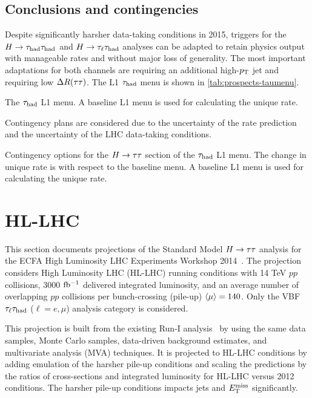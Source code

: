 \subsection{Conclusions and contingencies}

Despite significantly harsher data-taking conditions in 2015, triggers for the $H\rightarrow\tau_\text{had}\tau_\text{had}$ and $H\rightarrow\tau_\ell\tau_\text{had}$ analyses can be adapted to retain physics output with manageable rates and without major loss of generality. The most important adaptations for both channels are requiring an additional high-$p_{\mathrm{T}}$ jet and requiring low $\Delta R(\tau\tau)$. The L1 $\tau_\text{had}$ menu is shown in \cref{tab:prospects-taumenu}.

\begin{table}[!htpb]
  \centering
  \renewcommand{\arraystretch}{1.4}
  \caption{The $\tau_\text{had}$ L1 menu. A baseline L1 menu is used for calculating the unique rate.}
  
  \label{tab:prospects-taumenu}
\end{table}

Contingency plans are considered due to the uncertainty of the rate prediction and the uncertainty of the LHC data-taking conditions.

\begin{table}[!htpb]
  \centering
  \renewcommand{\arraystretch}{1.4}
  \caption{Contingency options for the $H\rightarrow\tau\tau$ section of the $\tau_\text{had}$ L1 menu. The change in unique rate is with respect to the baseline menu. A baseline L1 menu is used for calculating the unique rate.}
  
  \label{tab:prospects-contingencies}
\end{table}

\clearpage

\section{HL-LHC}
\label{sec:prospects-hllhc}

This section documents projections of the Standard Model $H\rightarrow\tau\tau$ analysis for the ECFA High Luminosity LHC Experiments Workshop 2014~\cite{ATL-PHYS-PUB-2014-018}. The projection considers High Luminosity LHC (HL-LHC) running conditions with 14 TeV $pp$ collisions, 3000 $\mbox{fb$^{-1}$}$ delivered integrated luminosity, and an average number of overlapping $pp$ collisions per bunch-crossing (pile-up) $\langle\mu\rangle = 140$. Only the VBF $\tau_\ell\tau_\text{had}$ ($\ell = e,\mu$) analysis category is considered.

This projection is built from the existing Run-I analysis~\cite{HIGG-2013-32} by using the same data samples, Monte Carlo samples, data-driven background estimates, and multivariate analysis (MVA) techniques. It is projected to HL-LHC conditions by adding emulation of the harsher pile-up conditions and scaling the predictions by the ratios of cross-sections and integrated luminosity for HL-LHC versus 2012 conditions. The harsher pile-up conditions impacts jets and $E_{\mathrm{T}}^{\mathrm{miss}}$ significantly.

